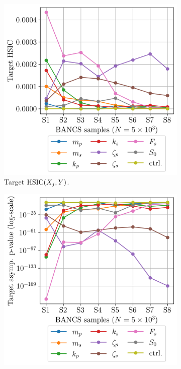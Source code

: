 \begin{figure}
    \centering
    \begin{subfigure}[b]{0.48\linewidth}
        \centering
        \includegraphics[width=\linewidth]{part3/figures/BANCS/oscillator_THSIC.png}
        \caption{Target $\mathrm{HSIC}(X_j, Y)$.}
    \end{subfigure}
    \hfill
    \begin{subfigure}[b]{0.48\linewidth}
        \centering
        \includegraphics[width=\linewidth]{part3/figures/BANCS/oscillator_Tpvalue_asymptotic.png}

\end{subfigure}
\end{figure}
